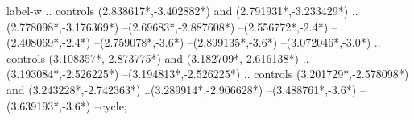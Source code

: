 {\begin{scope}[x=1mm,y=1mm,line width=\SCstroke mm,line cap=round,line join=round]
\begin{SCpart}{label-w}
.. controls ({2.838617*\SCF},{-3.402882*\SCF}) and ({2.791931*\SCF},{-3.233429*\SCF}) ..({2.778098*\SCF},{-3.176369*\SCF})
--({2.69683*\SCF},{-2.887608*\SCF})
--({2.556772*\SCF},{-2.4*\SCF})
--({2.408069*\SCF},{-2.4*\SCF})
--({2.759078*\SCF},{-3.6*\SCF})
--({2.899135*\SCF},{-3.6*\SCF})
--({3.072046*\SCF},{-3.0*\SCF})
.. controls ({3.108357*\SCF},{-2.873775*\SCF}) and ({3.182709*\SCF},{-2.616138*\SCF}) ..({3.193084*\SCF},{-2.526225*\SCF})
--({3.194813*\SCF},{-2.526225*\SCF})
.. controls ({3.201729*\SCF},{-2.578098*\SCF}) and ({3.243228*\SCF},{-2.742363*\SCF}) ..({3.289914*\SCF},{-2.906628*\SCF})
--({3.488761*\SCF},{-3.6*\SCF})
--({3.639193*\SCF},{-3.6*\SCF})
--cycle;
\end{SCpart}
\end{scope}
}
